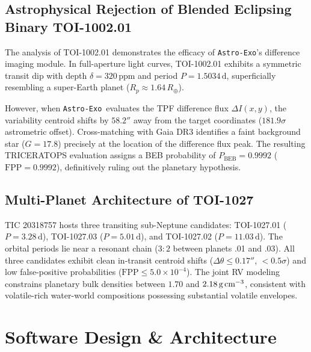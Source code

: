 \documentclass[twocolumn,trackchanges]{aastex631}
\newcommand{\astroexo}{\texttt{Astro-Exo}}
\begin{document}
\subsection{Astrophysical Rejection of Blended Eclipsing Binary TOI-1002.01}
\label{subsec:toi1002}

The analysis of TOI-1002.01 demonstrates the efficacy of \astroexo's difference imaging module. In full-aperture light curves, TOI-1002.01 exhibits a symmetric transit dip with depth $\delta = 320\,\text{ppm}$ and period $P = 1.5034\,\text{d}$, superficially resembling a super-Earth planet ($R_p \approx 1.64\,R_\oplus$). 

However, when \astroexo\ evaluates the TPF difference flux $\Delta I(x, y)$, the variability centroid shifts by $58.2''$ away from the target coordinates ($181.9\sigma$ astrometric offset). Cross-matching with Gaia DR3 identifies a faint background star ($G = 17.8$) precisely at the location of the difference flux peak. The resulting TRICERATOPS evaluation assigns a BEB probability of $P_{\text{BEB}} = 0.9992$ ($\mathrm{FPP} = 0.9992$), definitively ruling out the planetary hypothesis.

\subsection{Multi-Planet Architecture of TOI-1027}
\label{subsec:toi1027}

TIC 20318757 hosts three transiting sub-Neptune candidates: TOI-1027.01 ($P = 3.28\,\text{d}$), TOI-1027.03 ($P = 5.01\,\text{d}$), and TOI-1027.02 ($P = 11.03\,\text{d}$). The orbital periods lie near a resonant chain ($3:2$ between planets .01 and .03). All three candidates exhibit clean in-transit centroid shifts ($\Delta \theta \le 0.17''$, $< 0.5\sigma$) and low false-positive probabilities ($\mathrm{FPP} \le 5.0 \times 10^{-4}$). The joint RV modeling constrains planetary bulk densities between $1.70$ and $2.18\,\text{g\,cm}^{-3}$, consistent with volatile-rich water-world compositions possessing substantial volatile envelopes.

\section{Software Design \& Architecture}
\label{sec:architecture}
\end{document}

